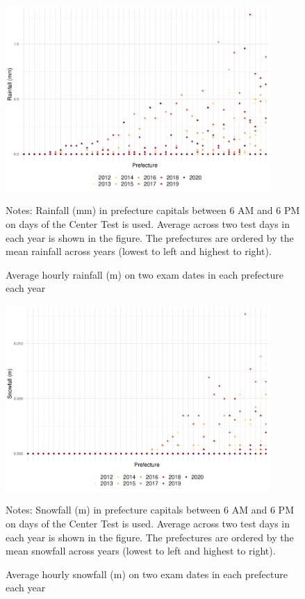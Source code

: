 \documentclass[12pt,letterpaper]{article}
\begin{document}
\begin{figure}[H]
  \centering
  \caption{Average hourly rainfall (m) on two exam dates in each prefecture each year}
  \includegraphics[width = 0.9\textwidth]{../Output/images/rainfall_diff.pdf}
  \label{fig:rainfall_diff}
  \footnotesize
  \begin{tablenotes}
    \item Notes:
      Rainfall (mm) in prefecture capitals between 6 AM and 6 PM on days of the Center Test is used.
      Average across two test days in each year is shown in the figure.
      The prefectures are ordered by the mean rainfall across years (lowest to left and highest to right).
  \end{tablenotes}
\end{figure}

\begin{figure}[H]
  \centering
  \caption{Average hourly snowfall (m) on two exam dates in each prefecture each year}
  \includegraphics[width = 0.9\textwidth]{../Output/images/snowfall_diff.pdf}
  \label{fig:snowfall_diff}
  \footnotesize
  \begin{tablenotes}
    \item Notes:
      Snowfall (m) in prefecture capitals between 6 AM and 6 PM on days of the Center Test is used.
      Average across two test days in each year is shown in the figure.
      The prefectures are ordered by the mean snowfall across years (lowest to left and highest to right).
  \end{tablenotes}
\end{figure}
\end{document}
